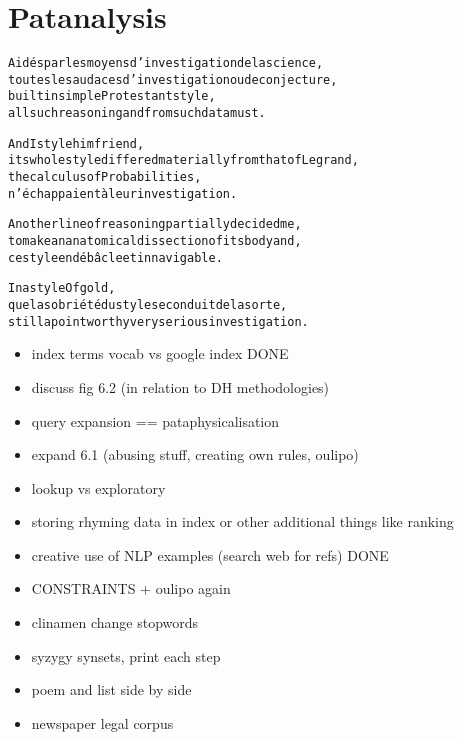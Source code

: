 
\chapter{Patanalysis}
\label{ch:analysis}

\startcontents[chapters]

\vfill

\begin{alltt}\sffamily
Aidés par les moyens d'investigation de la science,
toutes les audaces d'investigation ou de conjecture,
built in simple Protestant style,
all such reasoning and from such data must.

And I style him friend,
its whole style differed materially from that of Legrand,
the calculus of Probabilities,
n'échappaient à leur investigation.

Another line of reasoning partially decided me,
to make an anatomical dissection of its body and,
ce style en débâcle et innavigable.

In a style Of gold,
que la sobriété du style se conduit de la sorte,
still a point worthy very serious investigation.
\end{alltt}

\newpage
\minicontents
\spirals



\begin{itemize}
  \item index terms vocab vs google index DONE
  \item discuss fig 6.2 (in relation to DH methodologies)
  \item query expansion == pataphysicalisation
  \item expand 6.1 (abusing stuff, creating own rules, oulipo)
  \item lookup vs exploratory
  \item storing rhyming data in index or other additional things like ranking
  \item creative use of NLP examples (search web for refs) DONE
  \item CONSTRAINTS + oulipo again
  \item clinamen change stopwords
  \item syzygy synsets, print each step
  \item poem and list side by side
  \item newspaper legal corpus
\end{itemize}

